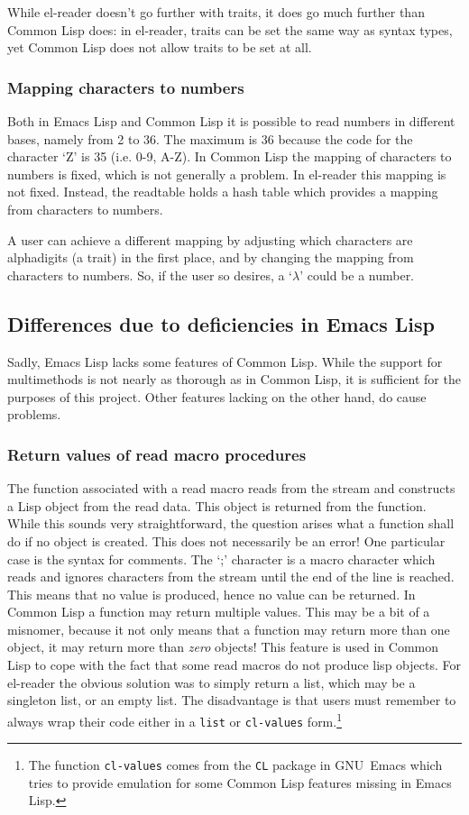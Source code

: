 \documentclass[a4paper,10pt,twoside]{report}
\newcommand{\el}{Emacs Lisp}
\newcommand{\cl}{Common Lisp}
\newcommand{\elr}{el-reader}
\newcommand{\sym}[1]{\texttt{#1}}
\newcommand{\fun}[1]{\texttt{#1}}
\newcommand{\emacs}{GNU~Emacs}
\begin{document}
While \elr{} doesn’t go further with traits, it does go much further than \cl{}
does: in \elr{}, traits can be set the same way as syntax types, yet \cl{} does
not allow traits to be set at all.

\subsubsection{Mapping characters to numbers}
\label{subsubsec:chars-to-nums}

Both in \el{} and \cl{} it is possible to read numbers in different bases,
namely from 2 to 36.  The maximum is 36 because the code for the character ‘Z’
is 35 (i.e. 0-9, A-Z).  In \cl{} the mapping of characters to numbers is fixed,
which is not generally a problem.  In \elr{} this mapping is not fixed.
Instead, the readtable holds a hash table which provides a mapping from
characters to numbers.

A user can achieve a different mapping by adjusting which characters are
alphadigits (a trait) in the first place, and by changing the mapping from
characters to numbers.  So, if the user so desires, a ‘\(\lambda{}\)’ could be a
number.

\subsection{Differences due to deficiencies in \el{}}
\label{subsec:deficiency-diffs}

Sadly, \el{} lacks some features of \cl{}.  While the support for multimethods
is not nearly as thorough as in \cl{}, it is sufficient for the purposes of this
project.  Other features lacking on the other hand, do cause problems.

\subsubsection{Return values of read macro procedures}
\label{subsubsec:ret-vals}

The function associated with a read macro reads from the stream and constructs a
Lisp object from the read data.  This object is returned from the function.
While this sounds very straightforward, the question arises what a function
shall do if no object is created.  This does not necessarily be an error!  One
particular case is the syntax for comments.  The ‘;’ character is a macro
character which reads and ignores characters from the stream until the end of
the line is reached.  This means that no value is produced, hence no value can
be returned.  In \cl{} a function may return multiple values.  This may be a bit
of a misnomer, because it not only means that a function may return more than
one object, it may return more than \emph{zero} objects!  This feature is used
in \cl{} to cope with the fact that some read macros do not produce lisp
objects.  For \elr{} the obvious solution was to simply return a list, which may
be a singleton list, or an empty list.  The disadvantage is that users must
remember to always wrap their code either in a \fun{list} or \fun{cl-values}
form.\footnote{The function \fun{cl-values} comes from the \sym{CL} package in
  \emacs{} which tries to provide emulation for some \cl{} features missing in
  \el{}.}
\end{document}
